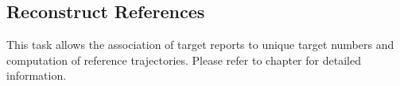 
\subsection{Reconstruct References}
\label{sec:ui_proc_reconst_references}

This task allows the association of target reports to unique target numbers and computation of reference trajectories. 
Please refer to chapter  for detailed information.
